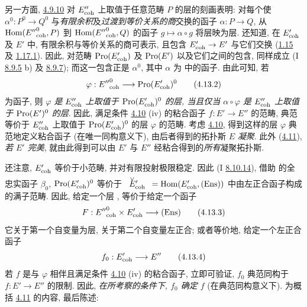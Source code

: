 另一方面, \hyperref[VI.subsubsec4.9.10]{4.9.10}
对 $E''_{\mathrm{coh}}$ 上取值于任意范畴 $P$ 的层的刻画表明:
对每个使 $\alpha^{0}:P^0\to Q^0$
与\emph{有限余积}及\pageoriginale{}\emph{过渡到等价关系的商}交换的函子
$\alpha:P\to Q$,
从 $\operatorname{Hom}({E''}^0_{\mathrm{coh}},P)$ 到 $\operatorname{Hom}({E''}^0_{\mathrm{coh}},Q)$
的函子 $g\mapsto\alpha\circ g$ 将层映为层.
还知道, 在 $E'_{\mathrm{coh}}$ 及 $E'$ 中,
有限余积与等价关系的商可表示,
且包含 $E'_{\coh}\to E'$ 与它们交换
(\hyperref[VI.cor1.15]{1.15} 及 \hyperref[VI.cor1.17.1]{1.17.1}).
因此, 对范畴 $\operatorname{Pro}(E'_{\mathrm{coh}})$ 及 $\operatorname{Pro}(E')$
以及它们之间的包含, 同样成立
(I \hyperref[I.prop8.9.5]{8.9.5} b) 及 \hyperref[I.prop8.9.7]{8.9.7});
而这一包含正是 $\alpha^0$,
其中 $\alpha$ 为  中的函子.
由此可知, 若
\begin{equation*}
\varphi:{E''}^0_{\coh}\to\Pro(E'_{\coh})^0\tag{4.13.2}
\end{equation*}
为函子, 则 \emph{$\varphi$ 是 $E''_{\mathrm{coh}}$ 上取值于
$\operatorname{Pro}(E'_{\mathrm{coh}})^0$ 的层,
当且仅当 $\alpha\circ\varphi$ 是 $E''_{\mathrm{coh}}$ 上取值于
$\operatorname{Pro}(E')^0$ 的层}.
因此, 满足条件 \hyperref[VI.prop4.10]{4.10} (iv)
的粘合函子 $f:E'\to E''$ 的范畴,
典范等价于 $E''_{\mathrm{coh}}$ 上取值于 $\operatorname{Pro}(E'_{\mathrm{coh}})^0$ 的层 $\varphi$ 的范畴.
考虑 \hyperref[VI.prop4.10]{4.10},
得到这样的层 $\varphi$ 典范地定义粘合函子
(在唯一同构意义下),
由后者得到的拓扑斯 $E$ \emph{凝聚}.
此外 (\hyperref[VI.cor4.11]{4.11}),
\emph{若 $E'$ 完美},
就由此得到可以由 $E'$ 与 $E''$ 经粘合得到的\emph{所有}凝聚拓扑斯.

还注意\pageoriginale{}, $E'_{\mathrm{coh}}$ 等价于小范畴,
并对有限投射极限稳定.
因此 (I \hyperref[I.sec8.10.14]{8.10.14}),
借助  的全忠实函子 $\beta_0$,
$\operatorname{Pro}(E'_{\mathrm{coh}})^0$ 等价于
$\Ev{\coh}=\Hom(E'_{\coh},(\Ens))$
中由左正合函子构成的满子范畴.
因此, 给定一个层 ,
等价于给定一个函子
\begin{equation*}
F:{E''}_{\coh}^0\times E'_{\coh}\to(\Ens)\tag{4.13.3}
\end{equation*}
它关于第一个自变量为层, 关于第二个自变量左正合;
或者等价地, 给定一个左正合函子
\begin{equation*}
f_0:E'_{\coh}\to E''\tag{4.13.4}
\end{equation*}
若 $f$ 是与 $\varphi$ 相伴且满足条件
\hyperref[VI.prop4.10]{4.10} (iv) 的粘合函子,
立即可验证, $f_0$ 典范同构于 $f:E'\to E''$ 的限制.
因此, \emph{在所考察的条件下, $f_0$ 确定 $f$}
(在典范同构意义下).
为概括 \hyperref[VI.cor4.11]{4.11} 的内容, 最后陈述:

